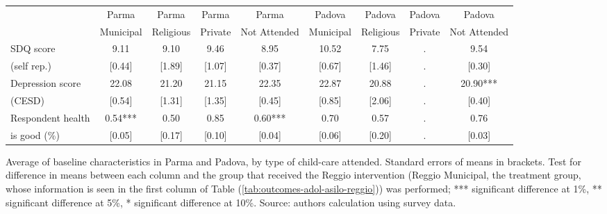\centering
\begin{adjustbox}{width=1\textwidth,center=\textwidth}
\small
\begin{tabular}{m{4.0cm} cccccccc}
\hline \hline 
& Parma & Parma & Parma & Parma & Padova & Padova & Padova & Padova \\
 & Municipal & Religious & Private & Not Attended & Municipal & Religious & Private & Not Attended \\
 \hline
SDQ score &  9.11  &  9.10  &  9.46  &  8.95  &  10.52  &  7.75 & . &  9.54 \\
(self rep.) &  [0.44]  &  [1.89]  &  [1.07]  &  [0.37]  &  [0.67]  &  [1.46]  & .&  [0.30] \\
Depression score &  22.08  &  21.20  &  21.15  &  22.35  &  22.87  &  20.88  & . &  20.90*** \\
(CESD) &  [0.54]  &  [1.31]  &  [1.35]  &  [0.45]  &  [0.85]  &  [2.06]   & . &  [0.40] \\
Respondent health &  0.54***  &  0.50  &  0.85  &  0.60***  &  0.70  &  0.57   & . &  0.76 \\
is good (\%) &  [0.05]  &  [0.17]  &  [0.10]  &  [0.04]  &  [0.06]  &  [0.20]   & . &  [0.03] \\
\hline
\end{tabular}

\end{adjustbox}
\raggedright{
\footnotesize{Average of baseline characteristics in Parma and Padova, by type of child-care attended. Standard errors of means in brackets. Test for difference in means between each column and the group that received the Reggio intervention (Reggio Municipal, the treatment group, whose information is seen in the first column of Table (\ref{tab:outcomes-adol-asilo-reggio})) was performed; *** significant difference at 1\%, ** significant difference at 5\%, * significant difference at 10\%. Source: authors calculation using survey data.}
}


